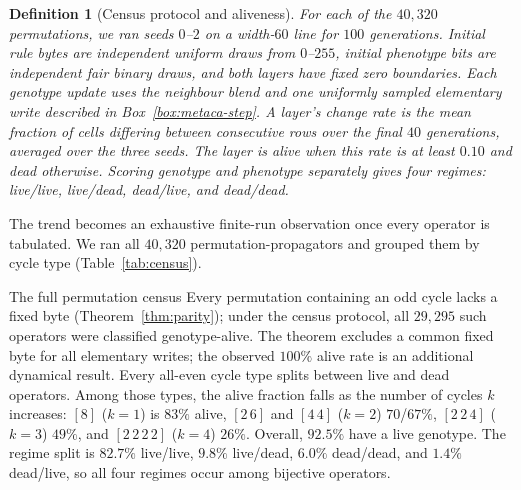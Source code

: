 \documentclass[man,12pt,floatsintext,donotrepeattitle]{apa7}
\newtheorem{definition}{Definition}
\begin{document}
\begin{definition}[Census protocol and aliveness]\label{def:aliveness}
For each of the $40{,}320$ permutations, we ran seeds $0$--$2$ on a width-$60$
line for $100$ generations. Initial rule bytes are independent uniform draws
from $0$--$255$, initial phenotype bits are independent fair binary draws, and
both layers have fixed zero boundaries. Each genotype update uses the
neighbour blend and one uniformly sampled elementary write described in
Box~\ref{box:metaca-step}. A layer's \emph{change rate} is the mean fraction of
cells differing between consecutive rows over the final $40$ generations,
averaged over the three seeds. The layer is \emph{alive} when this rate is at
least $0.10$ and \emph{dead} otherwise. Scoring genotype and phenotype
separately gives four regimes: live/live, live/dead, dead/live, and dead/dead.
\end{definition}

The trend becomes an exhaustive finite-run observation once every operator is tabulated. We ran all
$40{,}320$ permutation-propagators and grouped them by cycle type
(Table~\ref{tab:census}).

\begin{empiricalfinding}[label={find:census}]{The full permutation census}
Every permutation containing an odd cycle lacks a fixed byte
(Theorem~\ref{thm:parity}); under the census protocol, all $29{,}295$ such
operators were classified genotype-alive. The theorem excludes a common fixed
byte for all elementary writes; the observed $100\%$ alive rate is an additional
dynamical result. Every all-even cycle type splits between live and dead
operators. Among those types, the alive fraction falls as the number of cycles
$k$ increases: $[8]$ ($k{=}1$) is $83\%$ alive, $[2\,6]$ and $[4\,4]$ ($k{=}2$)
$70$/$67\%$, $[2\,2\,4]$ ($k{=}3$) $49\%$, and $[2\,2\,2\,2]$ ($k{=}4$) $26\%$.
Overall, $92.5\%$ have a live genotype. The regime split is $82.7\%$ live/live,
$9.8\%$ live/dead, $6.0\%$ dead/dead, and $1.4\%$ dead/live, so all four regimes
occur among bijective operators.
\end{empiricalfinding}
\end{document}
